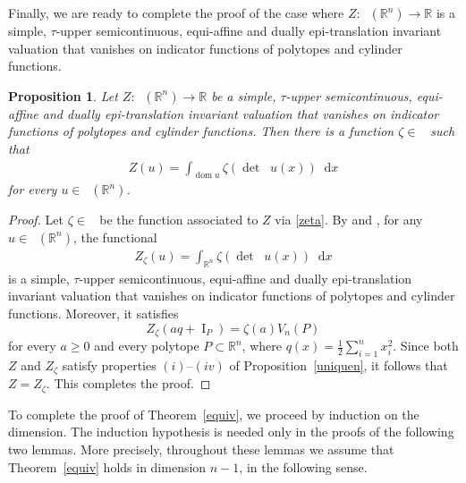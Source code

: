 \documentclass[11pt]{article}
\newtheorem{prop}[teo]{Proposition}
\theoremstyle{definition} %
\newcommand{\dif}{\mathop{}\!\mathrm{d}}
\newcommand{\RR}{(\mathbb{R}^n)}
\DeclareMathOperator{\I}{I}
\DeclareMathOperator{\dom}{dom}
\DeclareMathOperator{\D}{D^2}
\DeclareMathOperator{\LP}{Conv_{lp}}
\DeclareMathOperator{\conc}{Conc([0,\infty))}
\begin{document}
Finally, we are ready to complete the proof of the case where
$Z:\LP\RR\rightarrow\mathbb{R}$ is a simple, $\tau$-upper semicontinuous,
equi-affine and dually epi-translation invariant valuation that vanishes on
indicator functions of polytopes and cylinder functions.


\begin{prop}\label{prop}
Let $Z:\LP\RR\rightarrow\mathbb{R}$ be a simple, $\tau$-upper semicontinuous, equi-affine and  dually epi-translation   invariant valuation that   vanishes on  indicator functions of polytopes and cylinder functions. Then there is a   function $\zeta \in\conc$  such that
\begin{align*}
    Z(u)= \int_{\dom u}\zeta(\det \D u(x))\dif x
\end{align*}
for every $u\in \LP\RR$.
\end{prop}

\begin{proof}
Let $\zeta\in \conc$ be the function associated to $Z$ via  \eqref{zeta}.  By \cite[Theorem 1]{baetaludwigsemicontinuity} and \cite[Lemma~12]{baeta1d},  for any $u \in \LP(\mathbb{R}^n)$, the functional 
\begin{align*}
    Z_{\zeta}(u)= \int_{\mathbb{R}^n}\zeta(\det \D u(x))\dif x
\end{align*}
is a simple, $\tau$-upper semicontinuous, equi-affine and dually epi-translation invariant valuation that vanishes on indicator functions of polytopes and cylinder functions. Moreover, it satisfies
$$Z_{\zeta}(aq+\I_P)= \zeta(a)V_n(P)$$ 
for every $a\geq 0$ and  every polytope $P\subset \mathbb{R}^n$,  where $q(x)=\frac{1}{2}\sum_{i=1}^n x_i^2$.  Since both $Z$ and $Z_\zeta$ satisfy properties $(i)$--$(iv)$ of Proposition~\ref{uniquen}, it follows that $Z=Z_{\zeta}$. This completes the proof.
\end{proof}


To complete the proof of Theorem~\ref{equiv}, we proceed by induction on the dimension. The induction hypothesis is needed only in the proofs of the following two lemmas. More precisely, throughout these lemmas we assume that Theorem~\ref{equiv} holds in dimension $n-1$, in the following sense.
\end{document}
